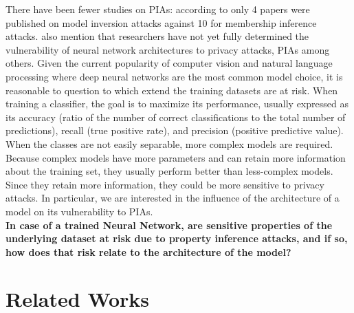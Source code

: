 \documentclass[11pt]{article}
\begin{document}
There have been fewer studies on PIAs: according to \citet{He2019} only 4 papers were published on model inversion attacks against 10 for membership inference attacks. \cite{He2019} also mention that researchers have not yet fully determined the vulnerability of neural network architectures to privacy attacks, PIAs among others. Given the current popularity of computer vision and natural language processing where deep neural networks are the most common model choice, it is reasonable to question to which extend the training datasets are at risk. When training a classifier, the goal is to maximize its performance, usually expressed as its accuracy (ratio of the number of correct classifications to the total number of predictions), recall (true positive rate), and precision (positive predictive value). When the classes are not easily separable, more complex models are required. Because complex models have more parameters and can retain more information about the training set, they usually perform better than less-complex models. Since they retain more information, they could be more sensitive to privacy attacks. In particular, we are interested in the influence of the architecture of a model on its vulnerability to PIAs.\\

\textbf{In case of a trained Neural Network, are sensitive properties of the underlying dataset at risk due to property inference attacks, and if so, how does that risk relate to the architecture of the model?}

\section{Related Works}
\end{document}
